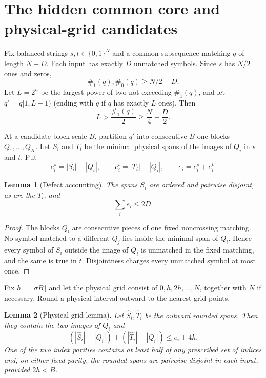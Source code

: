 \documentclass[11pt]{article}
\newtheorem{lemma}[lemma]{Lemma}
\theoremstyle{remark}
\newcommand{\ones}{\#_1}
\newcommand{\zeros}{\#_0}
\begin{document}
\section{The hidden common core and physical-grid candidates}
\label{sec:hidden-core}

Fix balanced strings $s,t\in\{0,1\}^N$ and a common subsequence matching
$q$ of length $N-D$.  Each input has exactly $D$ unmatched symbols.  Since
$s$ has $N/2$ ones and zeros,
\begin{equation}\label{eq:q-counts}
 \ones(q),\zeros(q)\ge N/2-D.
\end{equation}
Let $L=2^n$ be the largest power of two not exceeding $\ones(q)$, and let
$q'=q[1,L+1)$ (ending with $q$ if $q$ has exactly $L$ ones).
Then
\begin{equation}\label{eq:L-linear}
 L>\frac{\ones(q)}2\ge \frac N4-\frac D2.
\end{equation}

At a candidate block scale $B$, partition $q'$ into consecutive $B$-one
blocks $Q_1,\dots,Q_K$.  Let $S_i$ and $T_i$ be the minimal physical spans
of the images of $Q_i$ in $s$ and $t$.  Put
\[
 e_i^s=|S_i|-|Q_i|,\qquad e_i^t=|T_i|-|Q_i|,
 \qquad e_i=e_i^s+e_i^t.
\]

\begin{lemma}[Defect accounting]\label{lem:defect}
The spans $S_i$ are ordered and pairwise disjoint, as are the $T_i$, and
\[
 \sum_i e_i\le 2D.
\]
\end{lemma}

\begin{proof}
The blocks $Q_i$ are consecutive pieces of one fixed noncrossing matching.
No symbol matched to a different $Q_j$ lies inside the minimal span of
$Q_i$.  Hence every symbol of $S_i$ outside the image of $Q_i$ is unmatched
in the fixed matching, and the same is true in $t$.  Disjointness charges
every unmatched symbol at most once.
\end{proof}

Fix $h=\lceil\sigma B\rceil$ and let the physical grid consist of
$0,h,2h,\dots,N$, together with $N$ if necessary.  Round a physical interval
outward to the nearest grid points.

\begin{lemma}[Physical-grid lemma]\label{lem:grid}
Let $\widehat S_i,\widehat T_i$ be the outward rounded spans.  Then they
contain the two images of $Q_i$ and
\[
 (|\widehat S_i|-|Q_i|)+(|\widehat T_i|-|Q_i|)
 \le e_i+4h.
\]
One of the two index parities contains at least half of any prescribed set of
indices and, on either fixed parity, the rounded spans are pairwise disjoint
in each input, provided $2h<B$.
\end{lemma}
\end{document}
